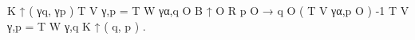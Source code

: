 K ↑ ( γq, γp ) T V γ,p = T W γα,q O B ↑ O R p O → q O ( T V γα,p O ) -1 T V γ,p = T W γ,q K ↑ ( q, p ) .
